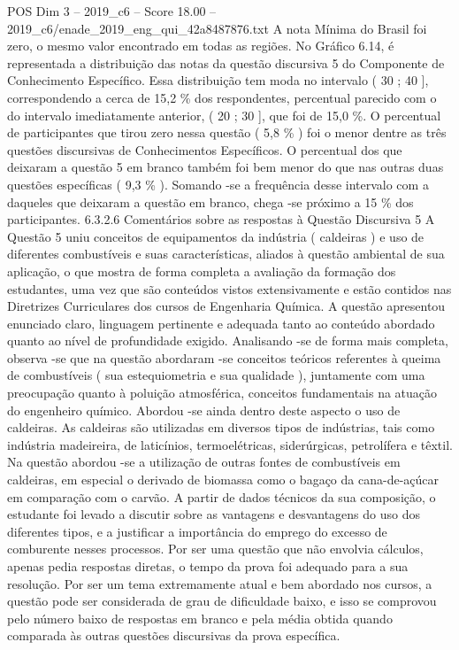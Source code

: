 \begin{textsample}{POS Dim 3 – 2019\_c6 – Score 18.00 – 2019\_c6/enade\_2019\_eng\_qui\_42a8487876.txt}
A nota Mínima do Brasil foi zero, o mesmo valor encontrado em todas as regiões.
No Gráfico 6.14, é representada a distribuição das notas da questão discursiva 5 do Componente de Conhecimento Específico.
Essa distribuição tem moda no intervalo ( 30 ; 40 ], correspondendo a cerca de 15,2 \% dos respondentes, percentual parecido com o do intervalo imediatamente anterior, ( 20 ; 30 ], que foi de 15,0 \%.
O percentual de participantes que tirou zero nessa questão ( 5,8 \% ) foi o menor dentre as três questões discursivas de Conhecimentos Específicos.
O percentual dos que deixaram a questão 5 em branco também foi bem menor do que nas outras duas questões específicas ( 9,3 \% ).
Somando -se a frequência desse intervalo com a daqueles que deixaram a questão em branco, chega -se próximo a 15 \% dos participantes. 6.3.2.6 Comentários sobre as respostas à Questão Discursiva 5 A Questão 5 uniu conceitos de equipamentos da indústria ( caldeiras ) e uso de diferentes combustíveis e suas características, aliados à questão ambiental de sua aplicação, o que mostra de forma completa a avaliação da formação dos estudantes, uma vez que são conteúdos vistos extensivamente e estão contidos nas Diretrizes Curriculares dos cursos de Engenharia Química.
A questão apresentou enunciado claro, linguagem pertinente e adequada tanto ao conteúdo abordado quanto ao nível de profundidade exigido.
Analisando -se de forma mais completa, observa -se que na questão abordaram -se conceitos teóricos referentes à queima de combustíveis ( sua estequiometria e sua qualidade ), juntamente com uma preocupação quanto à poluição atmosférica, conceitos fundamentais na atuação do engenheiro químico.
Abordou -se ainda dentro deste aspecto o uso de caldeiras.
As caldeiras são utilizadas em diversos tipos de indústrias, tais como indústria madeireira, de laticínios, termoelétricas, siderúrgicas, petrolífera e têxtil.
Na questão abordou -se a utilização de outras fontes de combustíveis em caldeiras, em especial o derivado de biomassa como o bagaço da cana-de-açúcar em comparação com o carvão.
A partir de dados técnicos da sua composição, o estudante foi levado a discutir sobre as vantagens e desvantagens do uso dos diferentes tipos, e a justificar a importância do emprego do excesso de comburente nesses processos.
Por ser uma questão que não envolvia cálculos, apenas pedia respostas diretas, o tempo da prova foi adequado para a sua resolução.
Por ser um tema extremamente atual e bem abordado nos cursos, a questão pode ser considerada de grau de dificuldade baixo, e isso se comprovou pelo número baixo de respostas em branco e pela média obtida quando comparada às outras questões discursivas da prova específica.

\end{textsample}
